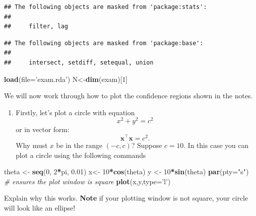 \documentclass[]{book}
\newenvironment{Shaded}{\begin{snugshade}}{\end{snugshade}}
\newcommand{\CommentTok}[1]{\textcolor[rgb]{0.56,0.35,0.01}{\textit{#1}}}
\newcommand{\DataTypeTok}[1]{\textcolor[rgb]{0.13,0.29,0.53}{#1}}
\newcommand{\DecValTok}[1]{\textcolor[rgb]{0.00,0.00,0.81}{#1}}
\newcommand{\FloatTok}[1]{\textcolor[rgb]{0.00,0.00,0.81}{#1}}
\newcommand{\KeywordTok}[1]{\textcolor[rgb]{0.13,0.29,0.53}{\textbf{#1}}}
\newcommand{\NormalTok}[1]{#1}
\newcommand{\OperatorTok}[1]{\textcolor[rgb]{0.81,0.36,0.00}{\textbf{#1}}}
\newcommand{\StringTok}[1]{\textcolor[rgb]{0.31,0.60,0.02}{#1}}
\providecommand{\tightlist}{%
  \setlength{\itemsep}{0pt}\setlength{\parskip}{0pt}}
\theoremstyle{definition}
\theoremstyle{definition}
\theoremstyle{definition}
\theoremstyle{remark}
\begin{document}
\begin{verbatim}
## The following objects are masked from 'package:stats':
## 
##     filter, lag
\end{verbatim}

\begin{verbatim}
## The following objects are masked from 'package:base':
## 
##     intersect, setdiff, setequal, union
\end{verbatim}

\begin{Shaded}
\begin{Highlighting}[]
\KeywordTok{load}\NormalTok{(}\DataTypeTok{file=}\StringTok{'exam.rda'}\NormalTok{)}
\NormalTok{N<-}\KeywordTok{dim}\NormalTok{(exam)[}\DecValTok{1}\NormalTok{]}
\end{Highlighting}
\end{Shaded}

We will now work through how to plot the confidence regions shown in the notes.

\begin{enumerate}
\def\labelenumi{\roman{enumi}.}
\tightlist
\item
  Firstly, let's plot a circle with equation
  \[x^2+y^2=c^2\]
  or in vector form:
  \[\mathbf x^\top\mathbf x=c^2.\]
  Why must \(x\) be in the range \((-c,c)\)? Suppose \(c=10\). In this case you can plot a circle using the following commands
\end{enumerate}

\begin{Shaded}
\begin{Highlighting}[]
\NormalTok{theta <-}\StringTok{ }\KeywordTok{seq}\NormalTok{(}\DecValTok{0}\NormalTok{, }\DecValTok{2}\OperatorTok{*}\NormalTok{pi, }\FloatTok{0.01}\NormalTok{)}
\NormalTok{x<-}\StringTok{ }\DecValTok{10}\OperatorTok{*}\KeywordTok{cos}\NormalTok{(theta)}
\NormalTok{y <-}\StringTok{ }\DecValTok{10}\OperatorTok{*}\KeywordTok{sin}\NormalTok{(theta)}
\KeywordTok{par}\NormalTok{(}\DataTypeTok{pty=}\StringTok{"s"}\NormalTok{)  }\CommentTok{# ensures the plot window is square}
\KeywordTok{plot}\NormalTok{(x,y,}\DataTypeTok{type=}\StringTok{'l'}\NormalTok{)}
\end{Highlighting}
\end{Shaded}

Explain why this works. \textbf{Note} if your plotting window is not square, your circle will look like an ellipse!
\end{document}
